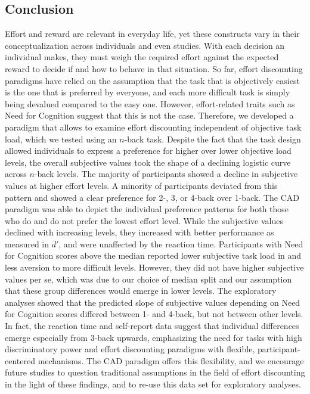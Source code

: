 \documentclass[
  man,floatsintext]{apa6}
\begin{document}
\hypertarget{conclusion}{%
\subsection{Conclusion}\label{conclusion}}

Effort and reward are relevant in everyday life, yet these constructs vary in their conceptualization across individuals and even studies.
With each decision an individual makes, they must weigh the required effort against the expected reward to decide if and how to behave in that situation.
So far, effort discounting paradigms have relied on the assumption that the task that is objectively easiest is the one that is preferred by everyone, and each more difficult task is simply being devalued compared to the easy one.
However, effort-related traits such as Need for Cognition suggest that this is not the case.
Therefore, we developed a paradigm that allows to examine effort discounting independent of objective task load, which we tested using an \(n\)-back task.
Despite the fact that the task design allowed individuals to express a preference for higher over lower objective load levels, the overall subjective values took the shape of a declining logistic curve across \(n\)-back levels.
The majority of participants showed a decline in subjective values at higher effort levels.
A minority of participants deviated from this pattern and showed a clear preference for 2-, 3, or 4-back over 1-back.
The CAD paradigm was able to depict the individual preference patterns for both those who do and do not prefer the lowest effort level.
While the subjective values declined with increasing levels, they increased with better performance as measured in \(d'\), and were unaffected by the reaction time.
Participants with Need for Cognition scores above the median reported lower subjective task load in and less aversion to more difficult levels.
However, they did not have higher subjective values per se, which was due to our choice of median split and our assumption that these group differences would emerge in lower levels.
The exploratory analyses showed that the predicted slope of subjective values depending on Need for Cognition scores differed between 1- and 4-back, but not between other levels.
In fact, the reaction time and self-report data suggest that individual differences emerge especially from 3-back upwards, emphasizing the need for tasks with high discriminatory power and effort discounting paradigms with flexible, participant-centered mechanisms.
The CAD paradigm offers this flexibility, and we encourage future studies to question traditional assumptions in the field of effort discounting in the light of these findings, and to re-use this data set for exploratory analyses.
\end{document}
